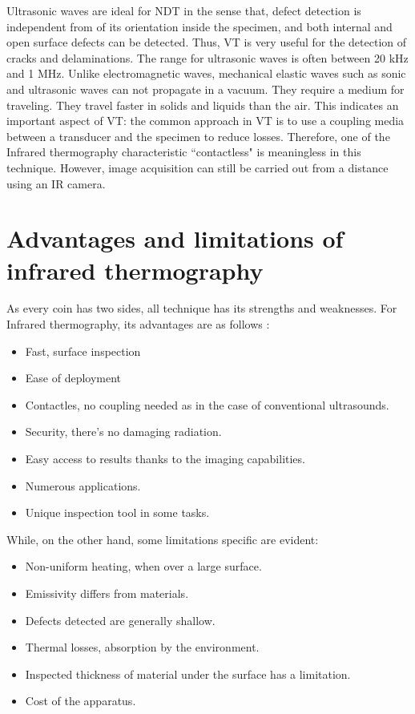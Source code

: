 Ultrasonic waves are ideal for NDT in the sense that, defect detection is independent from of its orientation inside the specimen, and both internal and open surface defects can be detected. Thus, VT is very useful for the detection of cracks and delaminations. The range for ultrasonic waves is often between 20 kHz and 1 MHz. Unlike electromagnetic waves, mechanical elastic waves such as sonic and ultrasonic waves can not propagate in a vacuum. They require a medium for traveling. They travel faster in solids and liquids than the air. This indicates an important aspect of VT: the common approach in VT is to use a coupling media between a transducer and the specimen to reduce losses. Therefore, one of the Infrared thermography characteristic ``contactless" is meaningless in this technique. However, image acquisition can still be carried out from a distance using an IR camera.

\section{Advantages and limitations of infrared thermography}
As every coin has two sides, all technique has its strengths and weaknesses. For Infrared thermography, its advantages are as follows \citep{maldague3introduction, Maldague2001theory}:
\begin{itemize}
	\item Fast, surface inspection
	\item Ease of deployment
	\item Contactles, no coupling needed as in the case of conventional ultrasounds.
	\item Security, there's no damaging radiation.
	\item Easy access to results thanks to the imaging capabilities.
	\item Numerous applications.
	\item Unique inspection tool in some tasks.
\end{itemize}
While, on the other hand, some limitations specific are evident:%
\begin{itemize}
	\item Non-uniform heating, when over a large surface.
	\item Emissivity differs from materials.
	\item Defects detected are generally shallow.
	\item Thermal losses, absorption by the environment.
	\item Inspected thickness of material under the surface has a limitation.
	\item Cost of the apparatus.
\end{itemize}

